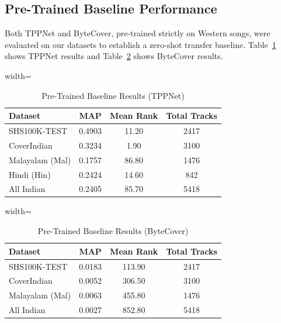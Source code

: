 \documentclass[conference]{IEEEtran}
\begin{document}
\subsection{Pre-Trained Baseline Performance}

Both TPPNet and ByteCover, pre-trained strictly on Western songs, were evaluated on our datasets to establish a zero-shot transfer baseline. Table~\ref{tab:tppnet_pretrained} shows TPPNet results and Table~\ref{tab:bytecover_pretrained} shows ByteCover results.

\begin{table}[htbp]
    \caption{Pre-Trained Baseline Results (TPPNet)}
    \label{tab:tppnet_pretrained}
    \centering
    \begin{adjustbox}{width=\columnwidth}
    \begin{tabular}{lccc}
    \toprule
    \textbf{Dataset} & \textbf{MAP} & \textbf{Mean Rank} & \textbf{Total Tracks} \\
    \midrule
    SHS100K-TEST & 0.4903 & 11.20 & 2417 \\
    CoverIndian  & 0.3234 & 1.90  & 3100 \\
    Malayalam (Mal) & 0.1757 & 86.80 & 1476 \\
    Hindi (Hin)  & 0.2424 & 14.60 & 842  \\
    All Indian   & 0.2405 & 85.70 & 5418 \\
    \bottomrule
    \end{tabular}
    \end{adjustbox}
\end{table}

\begin{table}[htbp]
    \caption{Pre-Trained Baseline Results (ByteCover)}
    \label{tab:bytecover_pretrained}
    \centering
    \begin{adjustbox}{width=\columnwidth}
    \begin{tabular}{lccc}
    \toprule
    \textbf{Dataset} & \textbf{MAP} & \textbf{Mean Rank} & \textbf{Total Tracks} \\
    \midrule
    SHS100K-TEST & 0.0183 & 113.90 & 2417 \\
    CoverIndian  & 0.0052 & 306.50 & 3100 \\
    Malayalam (Mal) & 0.0063 & 455.80 & 1476 \\
    All Indian   & 0.0027 & 852.80 & 5418 \\
    \bottomrule
    \end{tabular}
    \end{adjustbox}
\end{table}
\end{document}
